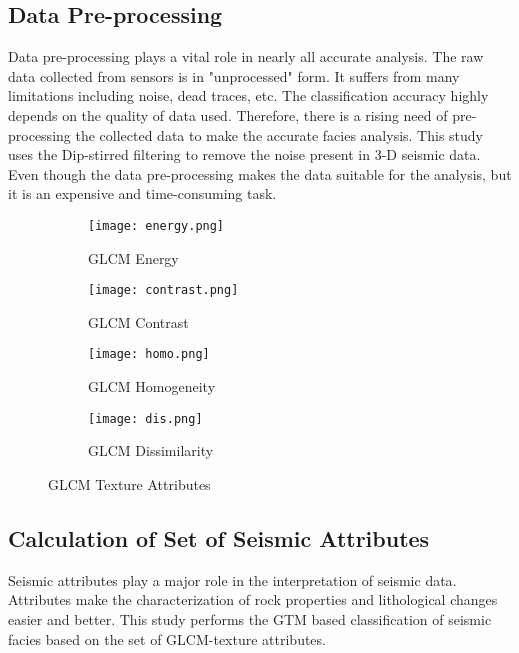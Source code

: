 \documentclass[a4paper]{article}
\begin{document}
\subsection{Data Pre-processing}
Data pre-processing plays a vital role in nearly all accurate analysis. The raw data collected from sensors is in "unprocessed" form. It suffers from many limitations including noise, dead traces, etc. The classification accuracy highly depends on the quality of data used. Therefore, there is a rising need of pre-processing the collected data to make the accurate facies analysis. This study uses the Dip-stirred filtering\cite{filter} to remove the noise present in 3-D seismic data. Even though the data pre-processing makes the data suitable for the analysis, but it is an expensive and time-consuming task.
\begin{figure*}[!t]
\centering
\begin{subfigure}{0.5\textwidth}
\centering
\texttt{[image: energy.png]}
\caption{GLCM Energy}
\label{fig:left}
\end{subfigure}
\begin{subfigure}{0.49\textwidth}
\centering
\texttt{[image: contrast.png]}
\caption{GLCM Contrast}
\label{fig:right}
\end{subfigure}
\begin{subfigure}{0.5\textwidth}
\centering
\texttt{[image: homo.png]}
\caption{GLCM Homogeneity}
\label{fig:left}
\end{subfigure}
\begin{subfigure}{0.49\textwidth}
\centering
\texttt{[image: dis.png]}
\caption{GLCM Dissimilarity}
\label{fig:right}
\end{subfigure}
\caption{GLCM Texture Attributes}
\label{fig:combined}
\end{figure*}
\subsection{Calculation of Set of Seismic Attributes}
Seismic attributes play a major role in the interpretation of seismic data\cite{6}. Attributes make the characterization of rock properties and lithological changes easier and better. This study performs the GTM based classification of seismic facies based on the set of GLCM-texture attributes\cite{texture}.
\end{document}
